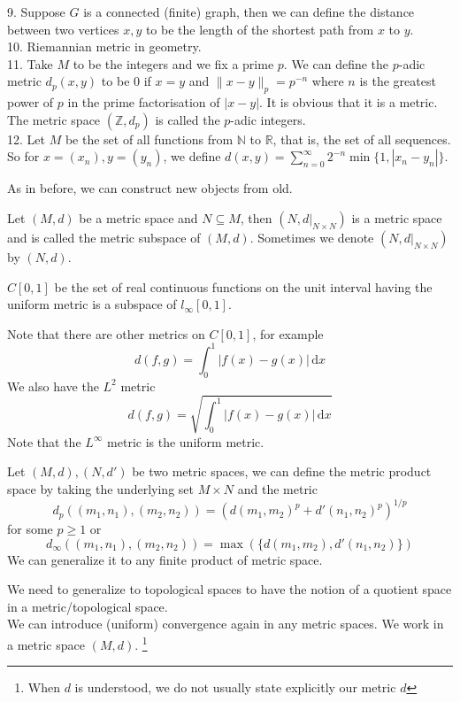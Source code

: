 \begin{example}
    9. Suppose $G$ is a connected (finite) graph, then we can define the distance between two vertices $x,y$ to be the length of the shortest path from $x$ to $y$.\\
    10. Riemannian metric in geometry.\\
    11. Take $M$ to be the integers and we fix a prime $p$.
    We can define the $p$-adic metric $d_p(x,y)$ to be $0$ if $x=y$ and $\|x-y\|_p=p^{-n}$ where $n$ is the greatest power of $p$ in the prime factorisation of $|x-y|$.
    It is obvious that it is a metric.
    The metric space $(\mathbb Z,d_p)$ is called the $p$-adic integers.\\
    12. Let $M$ be the set of all functions from $\mathbb N$ to $\mathbb R$, that is, the set of all sequences.
    So for $x=(x_n),y=(y_n)$, we define $d(x,y)=\sum_{n=0}^\infty 2^{-n}\min\{1,|x_n-y_n|\}$.
\end{example}
As in before, we can construct new objects from old.
\begin{definition}
    Let $(M,d)$ be a metric space and $N\subseteq M$, then $(N,d|_{N\times N})$ is a metric space and is called the metric subspace of $(M,d)$.
    Sometimes we denote $(N,d|_{N\times N})$ by $(N,d)$.
\end{definition}
\begin{example}
    $C[0,1]$ be the set of real continuous functions on the unit interval having the uniform metric is a subspace of $l_\infty[0,1]$.
\end{example}
Note that there are other metrics on $C[0,1]$, for example
$$d(f,g)=\int_0^1|f(x)-g(x)|\,\mathrm dx$$
We also have the $L^2$ metric
$$d(f,g)=\sqrt{\int_0^1|f(x)-g(x)|\,\mathrm dx}$$
Note that the $L^\infty$ metric is the uniform metric.
\begin{definition}
    Let $(M,d),(N,d')$ be two metric spaces, we can define the metric product space by taking the underlying set $M\times N$ and the metric
    $$d_p((m_1,n_1),(m_2,n_2))=(d(m_1,m_2)^p+d'(n_1,n_2)^p)^{1/p}$$
    for some $p\ge 1$ or
    $$d_\infty((m_1,n_1),(m_2,n_2))=\max(\{d(m_1,m_2),d'(n_1,n_2)\})$$
    We can generalize it to any finite product of metric space.
\end{definition}
We need to generalize to topological spaces to have the notion of a quotient space in a metric/topological space.\\
We can introduce (uniform) convergence again in any metric spaces.
We work in a metric space $(M,d)$.
\footnote{When $d$ is understood, we do not usually state explicitly our metric $d$}
